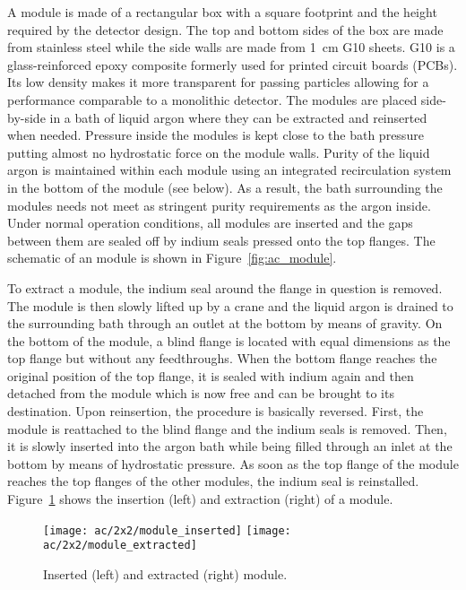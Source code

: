 A module is made of a rectangular box with a square footprint and the height required by the detector design.
The top and bottom sides of the box are made from stainless steel while the side walls are made from \SI{1}{\centi\metre} G10 sheets.
G10 is a glass-reinforced epoxy composite formerly used for printed circuit boards (PCBs).
Its low density makes it more transparent for passing particles allowing for a performance comparable to a monolithic detector.
The modules are placed side-by-side in a bath of liquid argon where they can be extracted and reinserted when needed.
Pressure inside the modules is kept close to the bath pressure putting almost no hydrostatic force on the module walls.
Purity of the liquid argon is maintained within each module using an integrated recirculation system in the bottom of the module (see below).
As a result, the bath surrounding the modules needs not meet as stringent purity requirements as the argon inside.
Under normal operation conditions, all modules are inserted and the gaps between them are sealed off by indium seals pressed onto the top flanges.
The schematic of an \AC{} module is shown in Figure~\ref{fig:ac_module}.

To extract a module, the indium seal around the flange in question is removed.
The module is then slowly lifted up by a crane and the liquid argon is drained to the surrounding bath through an outlet at the bottom by means of gravity.
On the bottom of the module, a blind flange is located with equal dimensions as the top flange but without any feedthroughs.
When the bottom flange reaches the original position of the top flange, it is sealed with indium again and then detached from the module which is now free and can be brought to its destination.
Upon reinsertion, the procedure is basically reversed.
First, the module is reattached to the blind flange and the indium seals is removed.
Then, it is slowly inserted into the argon bath while being filled through an inlet at the bottom by means of hydrostatic pressure.
As soon as the top flange of the module reaches the top flanges of the other modules, the indium seal is reinstalled.
Figure~\ref{fig:ac_module-ins-ext} shows the insertion (left) and extraction (right) of a module.

\begin{figure}[htb]
	\centering
	\texttt{[image: ac/2x2/module\_inserted]}
	\texttt{[image: ac/2x2/module\_extracted]}
	\caption{Inserted (left) and extracted (right) module.}
	\label{fig:ac_module-ins-ext}
\end{figure}

